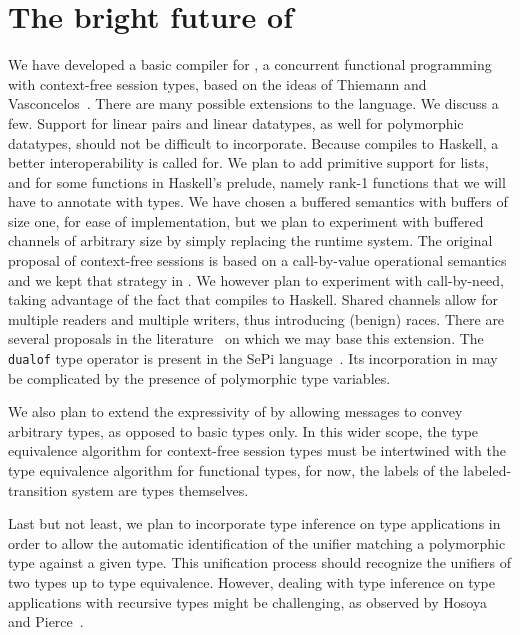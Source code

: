 \section{The bright future of \freest{}}
\label{sec:conclusion}

We have developed a basic compiler for \freest, a concurrent
functional programming with context-free session types, based on the
ideas of Thiemann and Vasconcelos~\cite{DBLP:conf/icfp/ThiemannV16}.
%
There are many possible extensions to the language. We discuss a
few.
%
Support for linear pairs and linear datatypes, as well for polymorphic
datatypes, should not be difficult to incorporate.
%
Because \freest{} compiles to Haskell, a better interoperability is
called for. We plan to add primitive support for lists, and for some
functions in Haskell's prelude, namely rank-1 functions that we will
have to annotate with \freest{} types.
%
We have chosen a buffered semantics with buffers of size one, for ease
of implementation, but we plan to experiment with buffered channels of
arbitrary size by simply replacing the runtime system.
%
The original proposal of context-free sessions is based on a
call-by-value operational semantics and we kept that strategy in
\freest. We however plan to experiment with call-by-need, taking
advantage of the fact that \freest{} compiles to Haskell.
%
Shared channels allow for multiple readers and multiple writers,
thus introducing (benign) races. There are several proposals in the
literature~\cite{DBLP:journals/pacmpl/BalzerP17,
  DBLP:conf/sefm/FrancoV13,Lindley.Morris_Lightweight.functional.session.types,DBLP:journals/iandc/Vasconcelos12}
on which we may base this extension.
%
The \lstinline|dualof| type operator is present in the SePi
language~\cite{DBLP:conf/sefm/FrancoV13}. Its incorporation in
\freest{} may be complicated by the presence of polymorphic type
variables.

We also plan to extend the expressivity of \freest{} by allowing
messages to convey arbitrary types, as opposed to basic types only.
In this wider scope, the type equivalence algorithm for context-free
session types must be intertwined with the type equivalence algorithm
for functional types, for now, the labels of the labeled-transition
system are types themselves.

Last but not least, we plan to incorporate type inference on type
applications in order to allow the automatic identification of the
unifier matching a polymorphic type against a given type. This
unification process should recognize the unifiers of two types up to
type equivalence. However, dealing with type inference on type
applications with recursive types might be challenging, as observed by
Hosoya and Pierce~\cite{DBLP:journals/toplas/PierceT00}.

